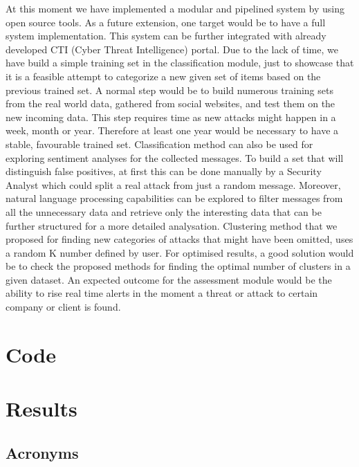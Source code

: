 \documentclass[12pt]{article}
\begin{document}
At this moment we have implemented a modular and pipelined system by using open source tools. As a future extension, one target would be to have a full system implementation. This system can be further integrated with already developed CTI (Cyber Threat Intelligence) portal. Due to the lack of time, we have build a simple training set in the classification module, just to showcase that it is a feasible attempt to categorize a new given set of items based on the previous trained set. A normal step would be to build numerous training sets from the real world data, gathered from social websites, and test them on the new incoming data. This step requires time as new attacks might happen in a week, month or year. Therefore at least one year would be necessary to have a stable, favourable trained set. Classification method can also be used for exploring sentiment analyses for the collected messages. To build a set that will distinguish false positives, at first this can be done manually by a Security Analyst which could split a real attack from just a random message. Moreover, natural language processing capabilities can be explored to filter messages from all the unnecessary data and retrieve only the interesting data that can be further structured for a more detailed analysation. Clustering method that we proposed for finding new categories of attacks that might have been omitted, uses a random K number defined by user. For optimised results, a good solution would be to check the proposed methods for finding the optimal number of clusters in a given dataset. An expected outcome for the assessment module would be the ability to rise real time alerts in the moment a threat or attack to certain company or client is found.



\newpage
\begin{appendices}
\section{Code}
\section{Results}

\end{appendices}

\subsection{Acronyms}
\end{document}
